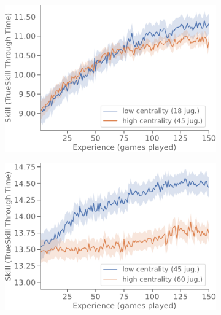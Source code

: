 \documentclass[a4paper,11pt]{book}
\theoremstyle{definition}
\begin{document}
\begin{figure}[ht!]
\begin{subfigure}[t]{0.32\textwidth}
	\end{subfigure}
	\begin{subfigure}[t]{0.32\textwidth}\centering
	\includegraphics[width=\linewidth]{static/paper/evolucion-ttt-inicial-low-load-centrality}
	\end{subfigure}
	\begin{subfigure}[t]{0.32\textwidth}\centering
	\includegraphics[width=\linewidth]{static/paper/evolucion-ttt-inicial-med-eigenvector-centrality}
	\end{subfigure}
	\begin{subfigure}[t]{0.32\textwidth}\centering

\end{subfigure}
\end{figure}
\end{document}
